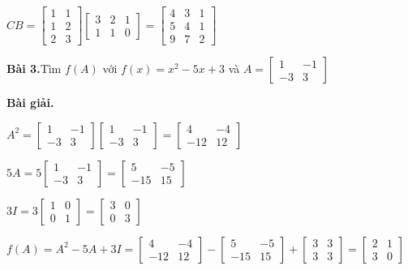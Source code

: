 \documentclass[12pt]{report}
\begin{document}
$CB = \begin{bmatrix} 1 & 1 \\ 1 & 2 \\ 2 & 3 \end{bmatrix} \begin{bmatrix} 3 & 2 & 1 \\ 1 & 1 & 0 \end{bmatrix} = \begin{bmatrix} 4 & 3 & 1 \\ 5 & 4 & 1 \\ 9 & 7 & 2 \end{bmatrix}$

\textbf{Bài 3.}Tìm $f(A)$ với $f(x) = x^2 - 5x + 3$ và $A = \begin{bmatrix} 1 & -1 \\ -3 & 3 \end{bmatrix}$ \newpage

\textbf{Bài giải.}

$A^2 = \begin{bmatrix} 1 & -1 \\ -3 & 3 \end{bmatrix} \begin{bmatrix} 1 & -1 \\ -3 & 3 \end{bmatrix} = \begin{bmatrix} 4 & -4 \\ -12 & 12 \end{bmatrix}$

$5A = 5\begin{bmatrix} 1 & -1 \\ -3 & 3 \end{bmatrix} = \begin{bmatrix} 5 & -5 \\ -15 & 15 \end{bmatrix}$

$3I = 3\begin{bmatrix} 1 & 0 \\ 0 & 1 \end{bmatrix} = \begin{bmatrix} 3 & 0 \\ 0 & 3 \end{bmatrix}$

$f(A) = A^2 - 5A + 3I = \begin{bmatrix} 4 & -4 \\ -12 & 12 \end{bmatrix} - \begin{bmatrix} 5 & -5 \\ -15 & 15 \end{bmatrix} + \begin{bmatrix} 3 & 3 \\ 3 & 3 \end{bmatrix} = \begin{bmatrix} 2 & 1 \\ 3 & 0 \end{bmatrix}$
\end{document}
